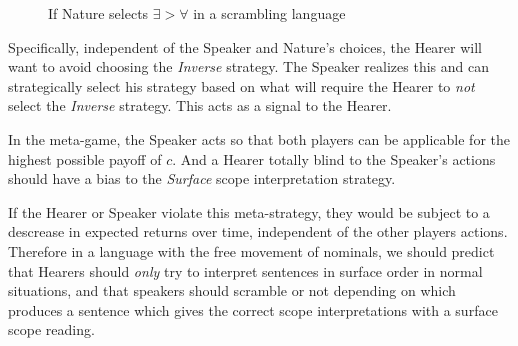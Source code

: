 \documentclass{article}
\begin{document}
\begin{figure}
\centering
{}
\caption{If Nature selects $\exists>\forall$ in a scrambling language\label{2s2}}
\end{figure}

Specifically, independent of the Speaker and Nature's choices, the Hearer will want to avoid choosing the \emph{Inverse} strategy. The Speaker realizes this and can strategically select his strategy based on what will require the Hearer to \emph{not} select the \emph{Inverse} strategy. This acts as a signal to the Hearer.

In the meta-game, the Speaker acts so that both players can be applicable for the highest possible payoff of $c$. And a Hearer totally blind to the Speaker's actions should have a bias to the \emph{Surface} scope interpretation strategy.

If the Hearer or Speaker violate this meta-strategy, they would be subject to a descrease in expected returns over time, independent of the other players actions. Therefore in a language with the free movement of nominals, we should predict that Hearers should \emph{only} try to interpret sentences in surface order in normal situations, and that speakers should scramble or not depending on which produces a sentence which gives the correct scope interpretations with a surface scope reading.
\end{document}
